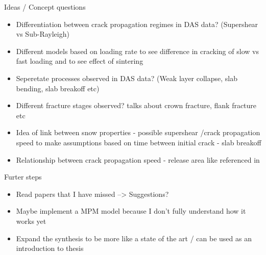 \documentclass[11pt,aspectratio=169]{beamer}
\begin{document}
\begin{frame}{Ideas / Concept questions}
    \begin{itemize}
        \item Differentiation between crack propagation regimes in DAS data? (Supershear vs Sub-Rayleigh)
        \item Different models based on loading rate to see difference in cracking of slow vs fast loading and to see effect of sintering
        \item Seperetate processes observed in DAS data? (Weak layer collapse, slab bending, slab breakoff etc)
        \item Different fracture stages observed? \cite{gaumeInvestigatingReleaseFlow2019} talks about crown fracture, flank fracture etc
        \item Idea of link between snow properties - possible supershear /crack propagation speed to make assumptions based on time between initial crack - slab breakoff
        \item Relationship between crack propagation speed - release area like referenced in \cite{bergfeldSignaturesSubRayleighSupershear2025}
    \end{itemize}
\end{frame}


\begin{frame}{Furter steps}
    \begin{itemize}
        \item Read papers that I have missed --> Suggestions?
        \item Maybe implement a MPM model because I don't fully understand how it works yet
        \item Expand the synthesis to be more like a state of the art / can be used as  an introduction to thesis
    \end{itemize}
    
\end{frame}


	
	
	
\end{document}
